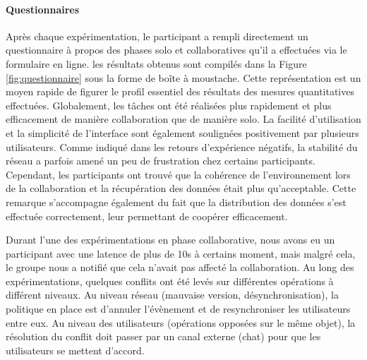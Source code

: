 \paragraph{Questionnaires}
Après chaque expérimentation, le participant a rempli directement un questionnaire 
à propos des phases solo et collaboratives qu'il a effectuées via le formulaire en 
ligne. les résultats obtenus sont compilés dans la Figure 
\ref{fig:questionnaire} sous la forme de boîte à moustache. Cette représentation 
est un moyen rapide de figurer le profil essentiel des résultats des mesures 
quantitatives effectuées.
Globalement, les tâches ont été réalisées plus rapidement et plus efficacement 
de manière collaboration que de manière solo. La facilité d'utilisation et la 
simplicité de l'interface sont également soulignées positivement par plusieurs 
utilisateurs. Comme indiqué dans les retours d'expérience négatifs, la stabilité du 
réseau a parfois amené un peu de frustration chez certains participants. 
Cependant, les participants ont trouvé que la cohérence de l'environnement lors de 
la collaboration et la récupération des données était plus qu'acceptable. Cette 
remarque s'accompagne également du fait que la distribution des données s'est 
effectuée correctement, leur permettant de coopérer efficacement.

Durant l'une des expérimentations en phase collaborative, nous avons eu un 
participant avec une latence de plus de 10s à certains moment, mais malgré cela, 
le groupe nous a notifié que cela n'avait pas affecté la collaboration. Au long des 
expérimentations, quelques conflits ont été levés sur différentes opérations à 
différent niveaux. Au niveau réseau (mauvaise version, désynchronisation), la 
politique en place est d'annuler l'évènement et de resynchroniser les utilisateurs 
entre eux. Au niveau des utilisateurs (opérations opposées sur le même objet), la 
résolution du conflit doit passer par un canal externe (chat) pour que les 
utilisateurs se mettent d'accord.  



